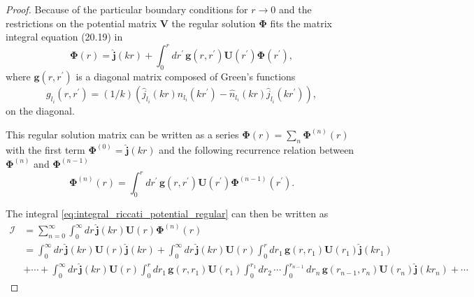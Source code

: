 \documentclass[mathpazo]{cicp}
\begin{document}
\begin{proof}
Because of the particular boundary conditions for $r \rightarrow 0$ and the restrictions on the potential matrix $\mathbold{V}$ the regular solution $\mathbold{\Phi}$ fits the matrix integral equation (20.19) in \cite{Taylor2006}
\begin{equation}
	\mathbold{\Phi}(r) = \hat{\mathbold{j}}(kr) + \int_0^r dr^\prime \, \mathbold{g}(r,r^\prime) \mathbold{U}(r^\prime) \mathbold{\Phi}(r^\prime), 
\end{equation}
where $\mathbold{g}(r,r^\prime)$ is a diagonal matrix composed of Green's functions
\begin{equation}
	g_{l_i}(r,r^\prime) = (1/k) \left( \hat j_{l_{i}}(kr)\hat n_{l_{i}}(kr^\prime) -\hat n_{l_{i}}(kr) \hat j_{l_{i}}(kr^\prime)\right),
\end{equation}
on the diagonal.

This regular solution matrix can be written as a series 
$\mathbold{\Phi}(r) = \sum_n \mathbold{\Phi}^{(n)}(r)$ with  the first term $\mathbold{\Phi}^{(0)} = \hat{\mathbold{j}}(kr)$ and the following recurrence relation between $\mathbold{\Phi}^{(n)}$ and $\mathbold{\Phi}^{(n-1)}$ 
\begin{equation}
	\mathbold{\Phi}^{(n)}(r) = \int_0^r dr^\prime \, \mathbold{g}(r,r^\prime)\mathbold{U}(r^\prime) \mathbold{\Phi}^{(n-1)}(r^\prime).
\end{equation}

The integral \eqref{eq:integral_riccati_potential_regular} can then be written as
\begin{align}
	\mathcal{I} &= \sum_{n=0}^{\infty} \int_0^\infty dr \, \hat{\mathbold{j}}(kr) \mathbold{U}(r) \mathbold{\Phi}^{(n)}(r) \\
	&= \int_0^\infty dr \, \hat{\mathbold{j}}(kr) \mathbold{U}(r) \hat{\mathbold{j}}(kr) + \int_0^\infty dr \, \hat{\mathbold{j}}(kr) \mathbold{U}(r) \int_0^r dr_{1} \, \mathbold{g}(r,r_{1}) \mathbold{U}(r_{1})\hat{\mathbold{j}}(kr_{1}) \\
	&+ \cdots + \int_0^\infty dr \, \hat{\mathbold{j}}(kr) \mathbold{U}(r) \int_0^r dr_1 \, \mathbold{g}(r,r_1) \mathbold{U}(r_1) \int_0^{r_1} dr_2 \, \cdots \int_0^{r_{n-1}} dr_n \, \mathbold{g}(r_{n-1},r_n)\mathbold{U}(r_n) \hat{\mathbold{j}}(kr_n) + \cdots
\end{align}


\end{proof}
\end{document}

